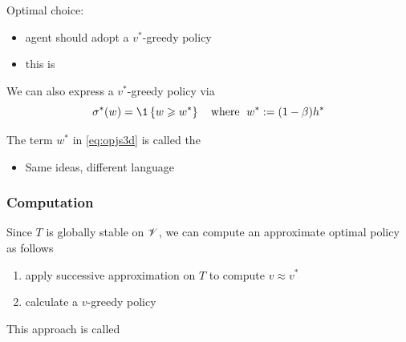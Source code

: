\begin{frame}
    
    Optimal choice:
    \begin{itemize}
        \item agent should adopt a $v^*$-greedy policy
            \vspace{0.5em}
        \item this is 
    \end{itemize}


            \vspace{0.5em}
            \vspace{0.5em}
    We can also express a $v^*$-greedy policy via
    \begin{equation}
        \label{eq:opjs3d}
        \sigma^*(w) 
        = \1
        \left\{
            w \geq w^*
        \right\}
        \quad \text{where } \;
        w^* := (1 - \beta) h^* 
    \end{equation}

            \vspace{0.5em}
            \vspace{0.5em}
    The term $w^*$ in \eqref{eq:opjs3d} is called the 

    \begin{itemize}
        \item Same ideas, different language
    \end{itemize}

\end{frame}


\begin{frame}
    \frametitle{Computation}

    Since $T$ is globally stable on $\mathscr V$, we can compute an approximate
    optimal policy as follows

            \vspace{0.5em}
    \begin{enumerate}
        \item apply successive approximation on $T$ to compute $v \approx v^*$
            \vspace{0.5em}
        \item calculate a $v$-greedy policy
    \end{enumerate}

            \vspace{0.5em}
            \vspace{0.5em}
            \vspace{0.5em}
    This approach is called 

\end{frame}



